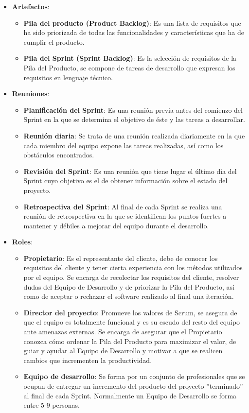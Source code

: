\begin{itemize}
    \item \textbf{Artefactos}:
    \begin{itemize}
        \item \textbf{Pila del producto (Product Backlog)}: Es una lista de requisitos que ha sido priorizada de todas las funcionalidades y características que ha de cumplir el producto. 
        \item \textbf{Pila del Sprint (Sprint Backlog)}: Es la selección de requisitos de la Pila del Producto, se compone de tareas de desarrollo que expresan los requisitos en lenguaje técnico.
    \end{itemize}
    \item \textbf{Reuniones}:
    \begin{itemize}
        \item \textbf{Planificación del Sprint}: Es una reunión previa antes del comienzo del Sprint en la que se determina el objetivo de éste y las tareas a desarrollar.
        \item \textbf{Reunión diaria}: Se trata de una reunión realizada diariamente en la que cada miembro del equipo expone las tareas realizadas, así como los obstáculos encontrados.
        \item \textbf{Revisión del Sprint}: Es una reunión que tiene lugar el último día del Sprint cuyo objetivo es el de obtener información sobre el estado del proyecto.
        \item \textbf{Retrospectiva del Sprint}: Al final de cada Sprint se realiza una reunión de retrospectiva en la que se identifican los puntos fuertes a mantener y débiles a mejorar del equipo durante el desarrollo.
    \end{itemize}
    \item \textbf{Roles}:
        \begin{itemize}
        \item \textbf{Propietario}: Es el representante del cliente, debe de conocer los requisitos del cliente y tener cierta experiencia con los métodos utilizados por el equipo. Se encarga de recolectar los requisitos del cliente, resolver dudas del Equipo de Desarrollo y de priorizar la Pila del Producto, así como de aceptar o rechazar el software realizado al final una iteración.
        \item \textbf{Director del proyecto}: Promueve los valores de Scrum, se asegura de que el equipo es totalmente funcional y es su escudo del resto del equipo ante amenazas externas. Se encarga de asegurar que el Propietario conozca cómo ordenar la Pila del Producto para maximizar el valor, de guiar y ayudar al Equipo de Desarrollo y motivar a que se realicen cambios que incrementen la productividad.
        \item \textbf{Equipo de desarrollo}: Se forma por un conjunto de profesionales que se ocupan de entregar un incremento del producto del proyecto ''terminado'' al final de cada Sprint. Normalmente un Equipo de Desarrollo se forma entre 5-9 personas.
    \end{itemize}
\end{itemize}

